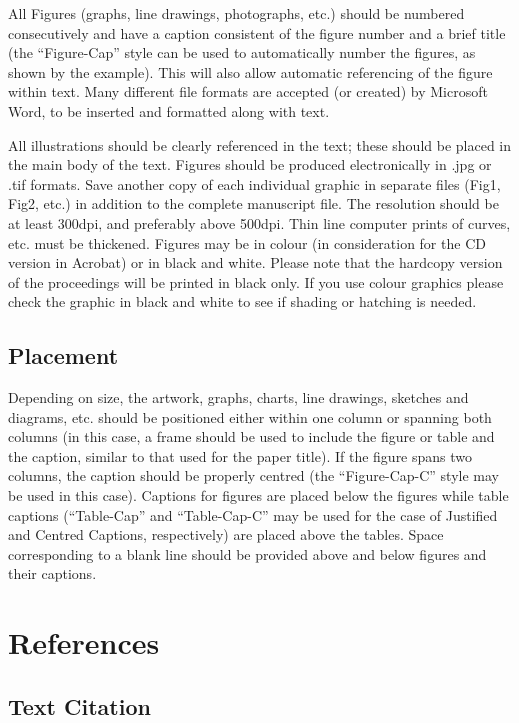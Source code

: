 \documentclass{stabs2021}
\begin{document}
All Figures (graphs, line drawings, photographs, etc.) should be
numbered consecutively and have a caption consistent of the figure
number and a brief title (the “Figure-Cap” style can be used to
automatically number the figures, as shown by the example). This will
also allow automatic referencing of the figure within text. Many
different file formats are accepted (or created) by Microsoft Word,
to be inserted and formatted along with text.

All illustrations should be clearly referenced in the text; these
should be placed in the main body of the text.  Figures should be
produced electronically in .jpg or .tif formats. Save another copy of
each individual graphic in separate files (Fig1, Fig2, etc.) in
addition to the complete manuscript file. The resolution should be at
least 300dpi, and preferably above 500dpi. Thin line computer prints
of curves, etc. must be thickened. Figures may be in colour (in
consideration for the CD version in Acrobat) or in black and
white. Please note that the hardcopy version of the proceedings will
be printed in black only. If you use colour graphics please check the
graphic in black and white to see if shading or hatching is needed.

\subsection{Placement}

Depending on size, the artwork, graphs, charts, line drawings,
sketches and diagrams, etc. should be positioned either within one
column or spanning both columns (in this case, a frame should be used
to include the figure or table and the caption, similar to that used
for the paper title). If the figure spans two columns, the caption
should be properly centred (the “Figure-Cap-C” style may be used in
this case). Captions for figures are placed below the figures while
table captions (“Table-Cap” and “Table-Cap-C” may be used for the case
of Justified and Centred Captions, respectively) are placed above the
tables. Space corresponding to a blank line should be provided above
and below figures and their captions.

\section{References}

\subsection{Text Citation}
\end{document}
